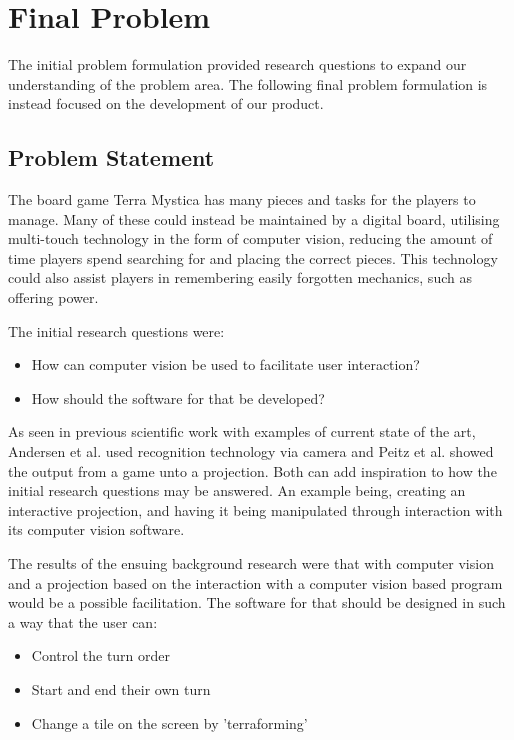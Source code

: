 \chapter{Final Problem}\label{ch:finprob}
The initial problem formulation provided research questions to expand our understanding of the problem area. The following final problem formulation is instead focused on the development of our product.

\section{Problem Statement}
The board game Terra Mystica has many pieces and tasks for the players to manage. Many of these could instead be maintained by a digital board, utilising multi-touch technology in the form of computer vision, reducing the amount of time players spend searching for and placing the correct pieces. This technology could also assist players in remembering easily forgotten mechanics, such as offering power.

The initial research questions were:
\begin{itemize}
	\item How can computer vision be used to facilitate user interaction?
	\item How should the software for that be developed?
\end{itemize}

As seen in previous scientific work with examples of current state of the art, Andersen et al. \citep{andersen_designing_2004} used recognition technology via camera and Peitz et al. \citep{peitzWizards2006} showed the output from a game unto a projection. Both can add inspiration to how the initial research questions may be answered. An example being, creating an interactive projection, and having it being manipulated through interaction with its computer vision software.

The results of the ensuing background research were that with computer vision and a projection based on the interaction with a computer vision based program would be a possible facilitation. %
The software for that should be designed in such a way that the user can:
\begin{itemize}
\item Control the turn order
\item Start and end their own turn
\item Change a tile on the screen by 'terraforming'
\end{itemize}

